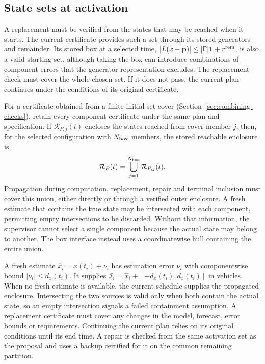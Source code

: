 \documentclass[final]{cas-sc}
\theoremstyle{definition}
\theoremstyle{plain}
\theoremstyle{definition}
\theoremstyle{plain}
\begin{document}
\subsection{State sets at activation}
\label{sec:activation-sets}

A replacement must be verified from the states that may be reached
when it starts. The current certificate provides such a set through
its stored generators and remainder. Its stored box at a selected time,
$|L(x-\mathbf p)|\le|\Gamma|\mathbf 1+r^{\rm rem}$, is also a valid
starting set, although taking the box can introduce combinations of
component errors that the generator representation excludes. The
replacement check must cover the whole chosen set. If it does not
pass, the current plan continues under the conditions of its original
certificate.

For a certificate obtained from a finite initial-set cover
(Section~\ref{sec:combining-checks}), retain every component certificate under
the same plan and specification. If $\mathcal R_{P,j}(t)$ encloses the
states reached from cover member $j$, then, for the selected
configuration with $N_{\rm box}$ members, the stored reachable
enclosure is
\begin{equation}
\mathcal R_P(t)=\bigcup_{j=1}^{N_{\rm box}}\mathcal R_{P,j}(t).
\label{eq:covered-reachable-union}
\end{equation}
Propagation during computation, replacement, repair and terminal
inclusion must cover this union, either directly or through a verified
outer enclosure. A fresh estimate that contains the true state may be
intersected with each component, permitting empty intersections to be
discarded. Without that information, the supervisor cannot select a
single component because the actual state may belong to another. The
box interface instead uses a coordinatewise hull containing the entire
union.

A fresh estimate $\widehat x_i=x(t_i)+\nu_i$ has estimation error
$\nu_i$ with componentwise bound $|\nu_i|\le d_x(t_i)$. It supplies
$\mathcal I_i=\widehat x_i+[-d_x(t_i),d_x(t_i)]$ in vehicles. When no
fresh estimate is available, the current schedule supplies the
propagated enclosure. Intersecting the two sources is valid only when
both contain the actual state, so an empty intersection signals a
failed containment assumption. A replacement certificate must cover
any changes in the model, forecast, error bounds or requirements.
Continuing the current plan relies on its original conditions until
its end time. A repair is checked from the same activation set as the
proposal and uses a backup certified for it on the common remaining
partition.
\end{document}
